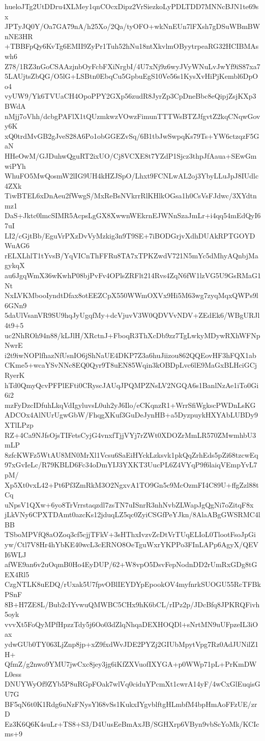 hueloJTg2UtDDru4XLMey1qnCOcxDipz2VrSiezkoLyPDLTDD7MNNcBJN1te69sx
JPTyJQ0Y/Oa7GA79nA/h25Xo/2Qa/tyOFO+wkNnEUn7lFXsh7gDSuWBmBWnNE3HR
+TBBFpQy6KvTg6EMII9ZyPr1Tuh52hNu18ntXkvlmOByytrpeaRG32HCIBMAswh6
Z78/1RZ3nGoCSAAzjnbOyFcbFXiNrgbI/4U7xNj9z6wyJVyWNuLvJwYf9iS87xa7
5LAUjtsZbQG/O5lG+LSBtn0EbqCu5GpbuEgS10Ve56s1KysXvHiPjKembl6DpOo4
vyUW9/Yk6TVUaCH4OpoPPY2GXp56zudR8JyrZp3CpDneBbc8eQipjZsjKXp3BWdA
nMjj7oVhh/dcbgPAFlX1tQUzmkwzVOwzFimunTTTWsBTZJfgvtZ2kqCNqwGovy6K
xQ0trdMvGB2gJveS28A6Po1obGGEZvSq/6B1tbJwSwpqKs79Ts+YW6ctzqzF5GaN
HHeOwM/GJDuhwQguRT2ixUO/Cj8VCXE8t7YZdP1Sjcz3thpJfAaua+SEwGmwiPYh
WhuFO5MwQosmW2lIG9UH4kHZJSpO/Lhxt9FCNLwAL2oj3YbyLLuJpJ8IUdlc4ZXk
TiwBTEL6xDnAeu2fWwgS/MxReBsNVkrrRlKHlkOGsa1h0CsVsFJdwc/3XYdtnmz1
DaS+Jktc0lmcSIMR5AcpsLgGX8XwwnWEkrnEJWNnSzaJmLr+i4qq54mEdQyI67uI
LI2/cGjtBb/EguVrPXzDvVyMzkig3n9T9SE+7iBODGrjvXdhDUAkRPTGOYDWuAG6
rELXLhlT1tYvsB/YqVICnThFFRu8TA7xTPKZwdV721N5mYc5dMhyAQnbjMagykqX
au6JgqWmX36wKwhP08bjPvFv4OPlsZRFlt214Rvs4ZqN6fW1lzVG5U9GsRMaG1Nt
NxLVKMbooIyndtDfax8otEEZCpX550WWmOXVx9Hi5M63wg7zyqMqxQWPs9l6GNn9
5daUlVsanVR9SU9hqJyUgqfMy+dcVjuvV3W0QDVVvNDV+ZEdEk6/WBgURJl4t9+5
uc2NhROh94n88/kLJlH/XRctnJ+FboqR3ThXcDb9zz7TgLwkyMDywRXhWFNpNwrE
i2t9iwNOPlfhazNfUsnIO6jShNaUE4DKP7Z3a6huJiizou862QQEovHF3hFQX1ab
CKme5+wcaYSvNNc8EQ0Qyr9T8uEN85Wqin3kOBDpLvc6lE9MaGxBLHciGCjRyerK
hTd0QmyQcvPFPlEFti0CRyscJAUqJPQMPZNsLV2NGQA6s1BanlNzAe1iTo0Gi6i2
mzFyDzcIDfuhLkqVdIgyluvsL0uh2yJ6Ilo/eCKqnzR1+WrrSfiWgkscPWDnLsKG
ADCOx4AlNUrUgwGbW/FhqgXKuf3GuDeJynHB+a5DyzpuykHXYAbLUBDy9XTlLPzp
RZ+4Ca9NJfsOjsTIFetsCyjG4vnxfTjjVYj7rZWt0XDOZrMmLR570ZMwmhbU3mLP
8zfcKWFz5WtAU8MN0MrXl1Vcsu6SaEiHYckLzksvk1pkQqZrhEds5pZi68tzcwEq
97xGvIeLc/R79KBLD6Fc34oDmYIJ3YXKT3UucPL6Z4VYqP9f6laiqVEmpYvL7pM/
Xp5Xt0vxL42+Pt6Pf3ZmRkM3O2NgxvA1TO9Gn5c9McOzmFI4C89U+ffgZzl88tCq
uNpsV1QXw+6yo8TrVrrstaqzdl7zsTN7uISnrR3nhNvbZLWapJgQgNi7oZitqF8x
jLkVNy6CPXTDAmt0azcKs12jduqLZ5qc0ZyiCSGfPeYJkn/8AlaABgGWSRMC4lBB
TSboMPVfQ8aOZoq3cf5cjjTFkV+3sHThxIvzvZcDtVrTUqELIoL0TlootFsoJpGi
yw/Ctl7V8Hr4hYbKE40wcL3cERNO8OeTguWxrYKPPo3FInLAPp6AgyX/QEVI6WLJ
afWE9an6v2uOqmB0Ho4EyDUP/62+W8vpO5DsvFepNodnDD2rUmRxGDg8tGEX4Rl5
CzgNTLK8uEDQ/rUxak5U7fpvOBlIEYDYpEpookOV4myfnrkSUOGU55RcTFBkPSnF
8B+H7ZE8L/Bub2cIYvwuQMWBC5CHx9hK6bCL/rIPz2p/JDcBfq8JPKRQFivh5oyk
vvvXt5FoQyMPfHpzzTdy5j6Oo03dZlqNhqaDEXHOQDl+sNrtMN9uUFpzeIL3iOax
ydwGUb0TY063LjZnp8jp+xZ9fxdWvJDE2PYZj2GIUbMpytVpg7Rz0AdJUNilZ1H+
QfmZ/g2nwo9YMU7jwCxc8jey3jg6iKfZXVuofIXYGA+p0WWp71pL+PrKmDWL0ess
DNUYWyOf9ZYb5P8uRGpFOak7wlVq0ciduYPcmXt1cwrA14yF/4wCxGlEuqisGU7G
BF5qN6t0K1Rdg6uNzFNysYl68vSs1KukxIYgvblftgHLmbfM4bpHmAoFFzUE/zrD
Ez3K6Q6K4suLr+TS8+S3/D4UusEeBmAxJB/SGHXrp6VByn9vbScYoMk/KCIcms+9
